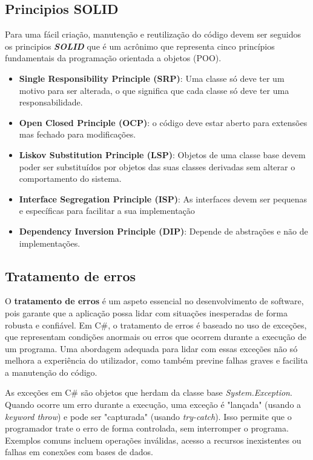 \documentclass[11pt]{scrartcl} %
\begin{document}
\subsection{Principios SOLID}
Para uma fácil criação, manutenção e reutilização do código devem ser seguidos os principios \textbf{\textit{SOLID}} que é um acrônimo que representa cinco princípios fundamentais da programação orientada a objetos (POO).
\begin{itemize}
	\item \textbf{Single Responsibility Principle (SRP)}: Uma classe só deve ter um motivo para ser alterada, o que significa que cada classe só deve ter uma responsabilidade.
	\item \textbf{Open Closed Principle (OCP)}: o código deve estar aberto para extensões mas fechado para modificações.
	\item \textbf{Liskov Substitution Principle (LSP)}: Objetos de uma classe base devem poder ser substituídos por objetos das suas classes derivadas sem alterar o comportamento do sistema.
	\item \textbf{Interface Segregation Principle (ISP)}: As interfaces devem ser pequenas e específicas para facilitar a sua implementação 
	\item \textbf{Dependency Inversion Principle (DIP)}: Depende de abstrações e não de implementações.
\end{itemize}

\subsection{Tratamento de erros}
O \textbf{tratamento de erros} é um aspeto essencial no desenvolvimento de software, pois garante que a aplicação possa lidar com situações inesperadas de forma robusta e confiável. Em C\#, o tratamento de erros é baseado no uso de exceções, que representam condições anormais ou erros que ocorrem durante a execução de um programa. Uma abordagem adequada para lidar com essas exceções não só melhora a experiência do utilizador, como também previne falhas graves e facilita a manutenção do código.

As exceções em C\# são objetos que herdam da classe base \textit{System.Exception}. Quando ocorre um erro durante a execução, uma exceção é "lançada" (usando a \textit{keyword throw}) e pode ser "capturada" (usando \textit{try-catch}). Isso permite que o programador trate o erro de forma controlada, sem interromper o programa. Exemplos comuns incluem operações inválidas, acesso a recursos inexistentes ou falhas em conexões com bases de dados.
\end{document}
